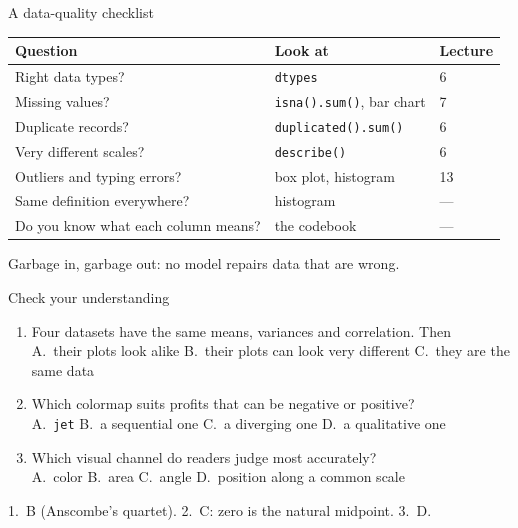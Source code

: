 \documentclass[handout,aspectratio=169,t,9pt]{beamer}
\begin{document}
\begin{frame}{A data-quality checklist}
  \vspace{0.2cm}
  \begin{tabular}{@{}lll@{}}
    \toprule
    \textbf{Question} & \textbf{Look at} & \textbf{Lecture} \\
    \midrule
    Right data types?           & \texttt{dtypes}               & 6 \\
    Missing values?             & \texttt{isna().sum()}, bar chart & 7 \\
    Duplicate records?          & \texttt{duplicated().sum()}   & 6 \\
    Very different scales?      & \texttt{describe()}           & 6 \\
    Outliers and typing errors? & box plot, histogram           & 13 \\
    Same definition everywhere? & histogram                     & --- \\
    Do you know what each column means? & the codebook          & --- \\
    \bottomrule
  \end{tabular}

  \vfill
  \begin{takeaway}
    Garbage in, garbage out: no model repairs data that are wrong.
  \end{takeaway}

\end{frame}

\begin{frame}{Check your understanding}
  \begin{exercise}
    \begin{enumerate}[itemsep=3pt,topsep=3pt]
      \item Four datasets have the same means, variances and correlation.
            Then\\
            A.~their plots look alike \quad
            B.~their plots can look very different \quad
            C.~they are the same data
      \item Which colormap suits profits that can be negative or positive?\\
            A.~\texttt{jet} \quad B.~a sequential one \quad
            C.~a diverging one \quad D.~a qualitative one
      \item Which visual channel do readers judge most accurately?\\
            A.~color \quad B.~area \quad C.~angle \quad
            D.~position along a common scale
    \end{enumerate}
  \end{exercise}

  \begin{solution}
    1.~B (Anscombe's quartet).  2.~C: zero is the natural midpoint.
    3.~D.
  \end{solution}
\end{frame}
\end{document}
